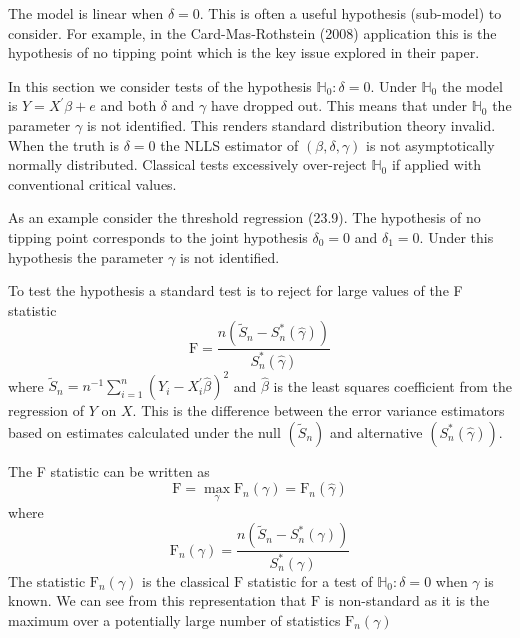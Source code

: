\documentclass[10pt]{article}
\begin{document}
The model is linear when $\delta=0$. This is often a useful hypothesis (sub-model) to consider. For example, in the Card-Mas-Rothstein (2008) application this is the hypothesis of no tipping point which is the key issue explored in their paper.

In this section we consider tests of the hypothesis $\mathbb{H}_{0}: \delta=0$. Under $\mathbb{H}_{0}$ the model is $Y=X^{\prime} \beta+e$ and both $\delta$ and $\gamma$ have dropped out. This means that under $\mathbb{H}_{0}$ the parameter $\gamma$ is not identified. This renders standard distribution theory invalid. When the truth is $\delta=0$ the NLLS estimator of $(\beta, \delta, \gamma)$ is not asymptotically normally distributed. Classical tests excessively over-reject $\mathbb{H}_{0}$ if applied with conventional critical values.

As an example consider the threshold regression (23.9). The hypothesis of no tipping point corresponds to the joint hypothesis $\delta_{0}=0$ and $\delta_{1}=0$. Under this hypothesis the parameter $\gamma$ is not identified.

To test the hypothesis a standard test is to reject for large values of the F statistic
$$
\mathrm{F}=\frac{n\left(\widetilde{S}_{n}-S_{n}^{*}(\widehat{\gamma})\right)}{S_{n}^{*}(\widehat{\gamma})}
$$
where $\widetilde{S}_{n}=n^{-1} \sum_{i=1}^{n}\left(Y_{i}-X_{i}^{\prime} \widehat{\beta}\right)^{2}$ and $\widehat{\beta}$ is the least squares coefficient from the regression of $Y$ on $X$. This is the difference between the error variance estimators based on estimates calculated under the null $\left(\widetilde{S}_{n}\right)$ and alternative $\left(S_{n}^{*}(\widehat{\gamma})\right)$.

The F statistic can be written as
$$
\mathrm{F}=\max _{\gamma} \mathrm{F}_{n}(\gamma)=\mathrm{F}_{n}(\widehat{\gamma})
$$
where
$$
\mathrm{F}_{n}(\gamma)=\frac{n\left(\widetilde{S}_{n}-S_{n}^{*}(\gamma)\right)}{S_{n}^{*}(\gamma)}
$$
The statistic $\mathrm{F}_{n}(\gamma)$ is the classical $\mathrm{F}$ statistic for a test of $\mathbb{H}_{0}: \delta=0$ when $\gamma$ is known. We can see from this representation that $\mathrm{F}$ is non-standard as it is the maximum over a potentially large number of statistics $\mathrm{F}_{n}(\gamma)$
\end{document}
